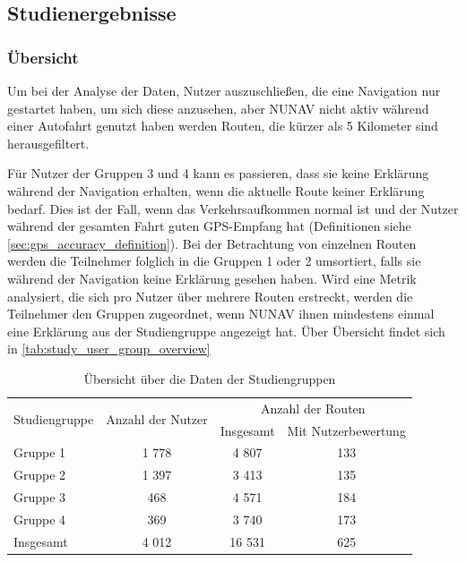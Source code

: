 \subsection{Studienergebnisse}
\label{sec:study_results_quantitativ}

\subsubsection{Übersicht}

Um bei der Analyse der Daten, Nutzer auszuschließen, die eine Navigation nur gestartet haben, um sich diese anzusehen, aber NUNAV nicht aktiv während einer Autofahrt genutzt haben werden Routen, die kürzer als 5 Kilometer sind herausgefiltert. 

Für Nutzer der Gruppen 3 und 4 kann es passieren, dass sie keine Erklärung während der Navigation erhalten, wenn die aktuelle Route keiner Erklärung bedarf. Dies ist der Fall, wenn das Verkehrsaufkommen \glqq normal\grqq{} ist und der Nutzer während der gesamten Fahrt guten GPS-Empfang hat (Definitionen siehe \autoref{sec:gps_accuracy_definition}). Bei der Betrachtung von einzelnen Routen werden die Teilnehmer folglich in die Gruppen 1 oder 2 umsortiert, falls sie während der Navigation keine Erklärung gesehen haben. Wird eine Metrik analysiert, die sich pro Nutzer über mehrere Routen erstreckt, werden die Teilnehmer den Gruppen zugeordnet, wenn NUNAV ihnen mindestens einmal eine Erklärung aus der Studiengruppe angezeigt hat. Über Übersicht findet sich in \autoref{tab:study_user_group_overview}

\begin{table}
    \centering
    \begin{tabular}{p{} c c c}
        \hline
        \multirow{2}{*}{Studiengruppe} & \multirow{2}{*}{Anzahl der Nutzer} & \multicolumn{2}{c}{Anzahl der Routen} \\
        & & Insgesamt & Mit Nutzerbewertung \\
        \toprule
        Gruppe 1            & 1 778  & 4 807  & 133 \\
        Gruppe 2            & 1 397  & 3 413  & 135 \\
        Gruppe 3            & 468   & 4 571  & 184 \\
        Gruppe 4            & 369   & 3 740  & 173 \\
        \midrule
        Insgesamt  & 4 012  & 16 531 & 625 \\ 
        \toprule
    \end{tabular}
    \caption{Übersicht über die Daten der Studiengruppen}
    \label{tab:study_user_group_overview}
\end{table}


